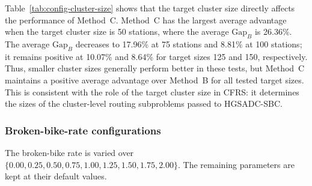 Table~\ref{tab:config-cluster-size} shows that the target cluster size directly
affects the performance of Method~C. Method~C has the largest average advantage
when the target cluster size is 50 stations, where the average $\text{Gap}_B$ is 26.36\%.
The average $\text{Gap}_B$ decreases to 17.96\% at 75 stations and 8.81\% at 100
stations; it remains positive at 10.07\% and 8.64\% for target sizes 125 and
150, respectively. Thus, smaller cluster sizes generally perform better in these
tests, but Method~C maintains a positive average advantage over Method~B for all
tested target sizes. This is consistent with the role of the target cluster size
in CFRS: it determines the sizes of the cluster-level routing subproblems passed
to HGSADC-SBC.

\subsubsection{Broken-bike-rate configurations}\label{sec:exp-config-broken-rate}\label{sec:exp-sens-broken}

The broken-bike rate is varied over
$\{0.00,0.25,0.50,0.75,1.00,1.25,1.50,1.75,2.00\}$. The remaining parameters are kept at
their default values.

